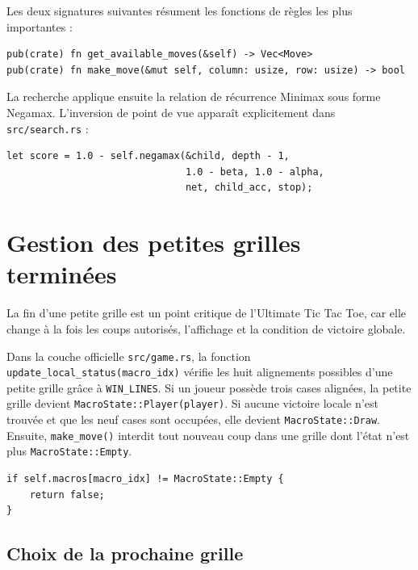 \documentclass{pssbmac}
\begin{document}
Les deux signatures suivantes résument les fonctions de règles les plus importantes :

\begin{lstlisting}[style=codeexcerpt,caption={Fonctions de règles principales dans \texttt{src/game.rs}}]
pub(crate) fn get_available_moves(&self) -> Vec<Move>
pub(crate) fn make_move(&mut self, column: usize, row: usize) -> bool
\end{lstlisting}

La recherche applique ensuite la relation de récurrence Minimax sous forme Negamax. L'inversion de point de vue apparaît explicitement dans \texttt{src/search.rs} :

\begin{lstlisting}[style=codeexcerpt,caption={Inversion de point de vue Negamax dans \texttt{src/search.rs}}]
let score = 1.0 - self.negamax(&child, depth - 1,
                               1.0 - beta, 1.0 - alpha,
                               net, child_acc, stop);
\end{lstlisting}

\section{Gestion des petites grilles terminées}

La fin d'une petite grille est un point critique de l'Ultimate Tic Tac Toe, car elle change à la fois les coups autorisés, l'affichage et la condition de victoire globale.

Dans la couche officielle \texttt{src/game.rs}, la fonction \texttt{update\_local\_status(macro\_idx)} vérifie les huit alignements possibles d'une petite grille grâce à \texttt{WIN\_LINES}. Si un joueur possède trois cases alignées, la petite grille devient \texttt{MacroState::Player(player)}. Si aucune victoire locale n'est trouvée et que les neuf cases sont occupées, elle devient \texttt{MacroState::Draw}. Ensuite, \texttt{make\_move()} interdit tout nouveau coup dans une grille dont l'état n'est plus \texttt{MacroState::Empty}.

\begin{lstlisting}[style=codeexcerpt,caption={Rejet d'un coup dans une petite grille terminée dans \texttt{src/game.rs}}]
if self.macros[macro_idx] != MacroState::Empty {
    return false;
}
\end{lstlisting}

\subsection{Choix de la prochaine grille}
\end{document}
